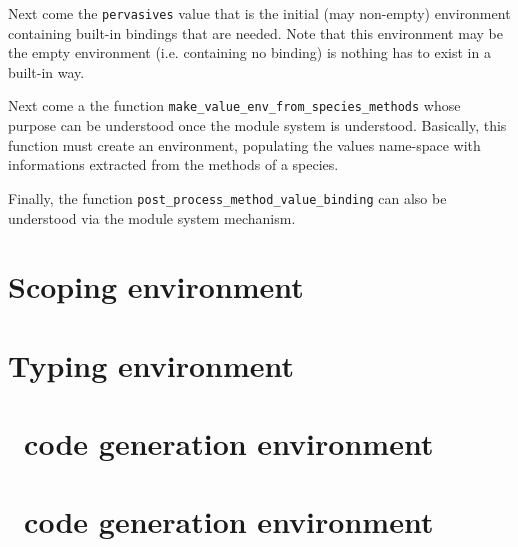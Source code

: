 Next come the {\tt pervasives} value that is the initial (may
non-empty) environment containing built-in bindings that are
needed. Note that this environment may be the empty environment
(i.e. containing no binding) is nothing has to exist in a built-in
way.

Next come a the function {\tt make\_value\_env\_from\_species\_methods}
whose purpose can be understood once the module system is
understood. Basically, this function must create an environment,
populating the values name-space with informations extracted from the
methods of a species.

Finally, the function {\tt post\_process\_method\_value\_binding} can
also be understood via the module system mechanism.


\section{Scoping environment}

\section{Typing environment}

\section{\ocaml\ code generation environment}

\section{\coq\ code generation environment}
